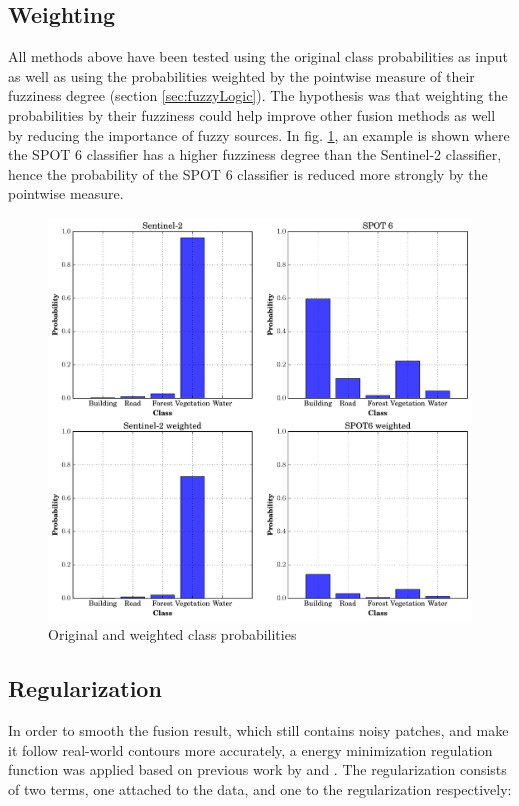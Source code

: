 \documentclass[10pt]{article}
\begin{document}
\subsection{Weighting}
All methods above have been tested using the original class probabilities as input  as well as using the probabilities weighted by the pointwise measure of their fuzziness degree (section \ref{sec:fuzzyLogic}). The hypothesis was that weighting the probabilities by their fuzziness could help improve other fusion methods as well by reducing the importance of fuzzy sources. In fig. \ref{fig:proba_point}, an example is shown where the SPOT 6 classifier has a higher fuzziness degree than the Sentinel-2 classifier, hence the probability of the SPOT 6 classifier is reduced more strongly by the pointwise measure.

\begin{figure}[H]
    \centering
    \includegraphics[width=.7\textwidth]{proba_point}
    \caption{Original and weighted class probabilities}
    \label{fig:proba_point}
\end{figure}


\subsection{Regularization}\label{sec:regularization}
In order to smooth the fusion result, which still contains noisy patches, and make it follow real-world contours more accurately, a  energy minimization regulation function was applied based on previous work by \cite{hervieu_fusion_2016} and \cite{ouerghemmi_two-step_2017}. The regularization consists of two terms, one attached to the data, and one to the regularization respectively:
\end{document}
